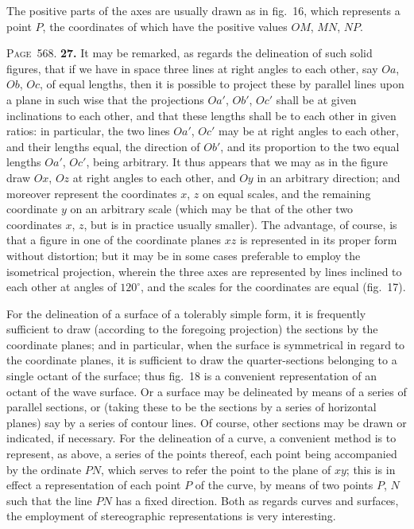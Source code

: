 \documentclass[11pt,a4paper]{book}
\begin{document}
The positive parts of the axes are usually drawn as in fig.~16, which represents a point $P$, the coordinates of which have the positive values $OM$, $MN$, $NP$.

\newpage
\noindent\textsc{Page~568.} \textbf{27.} It may be remarked, as regards the delineation of such solid figures, that if we have in space three lines at right angles to each other, say $Oa$, $Ob$, $Oc$, of equal lengths, then it is possible to project these by parallel lines upon a plane in such wise that the projections $Oa'$, $Ob'$, $Oc'$ shall be at given inclinations to each other, and that these lengths shall be to each other in given ratios: in particular, the two lines $Oa'$, $Oc'$ may be at right angles to each other, and their lengths equal, the direction of $Ob'$, and its proportion to the two equal lengths $Oa'$, $Oc'$, being arbitrary. It thus appears that we may as in the figure draw $Ox$, $Oz$ at right angles to each other, and $Oy$ in an arbitrary direction; and moreover represent the coordinates $x$, $z$ on equal scales, and the remaining coordinate $y$ on an arbitrary scale (which may be that of the other two coordinates $x$, $z$, but is in practice usually smaller). The advantage, of course, is that a figure in one of the coordinate planes $xz$ is represented in its proper form without distortion; but it may be in some cases preferable to employ the isometrical projection, wherein the three axes are represented by lines inclined to each other at angles of $120^\circ$, and the scales for the coordinates are equal (fig.~17).

For the delineation of a surface of a tolerably simple form, it is frequently sufficient to draw (according to the foregoing projection) the sections by the coordinate planes; and in particular, when the surface is symmetrical in regard to the coordinate planes, it is sufficient to draw the quarter-sections belonging to a single octant of the surface; thus fig.~18 is a convenient representation of an octant of the wave surface. Or a surface may be delineated by means of a series of parallel sections, or (taking these to be the sections by a series of horizontal planes) say by a series of contour lines. Of course, other sections may be drawn or indicated, if necessary. For the delineation of a curve, a convenient method is to represent, as above, a series of the points thereof, each point being accompanied by the ordinate $PN$, which serves to refer the point to the plane of $xy$; this is in effect a representation of each point $P$ of the curve, by means of two points $P$, $N$ such that the line $PN$ has a fixed direction. Both as regards curves and surfaces, the employment of stereographic representations is very interesting.
\end{document}
